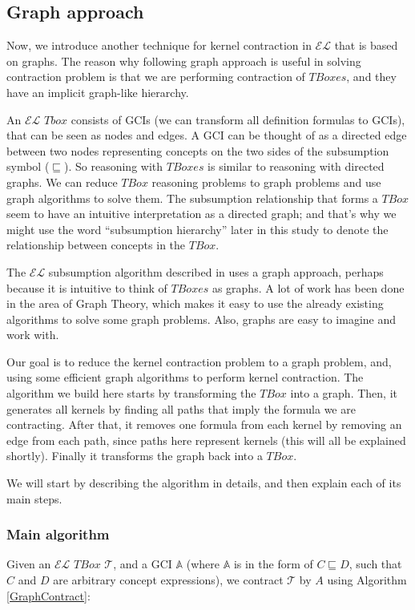 \subsection{Graph approach}
Now, we introduce another technique for kernel contraction in $\mathcal{EL}$ that is based on graphs. The reason why following graph approach is useful in solving contraction problem is that we are performing contraction of $TBoxes$, and they have an implicit graph-like hierarchy. 

An $\mathcal{EL}$ $Tbox$ consists of GCIs (we can transform all definition formulas to GCIs), that can be seen as nodes and edges. A GCI can be thought of as a directed edge between two nodes representing concepts on the two sides of the subsumption symbol ($\sqsubseteq$). So reasoning with $TBoxes$ is similar to reasoning with directed graphs. We can reduce $TBox$ reasoning problems to graph problems and use graph algorithms to solve them. The subsumption relationship that forms a $TBox$ seem to have an intuitive interpretation as a directed graph; and that's why we might use the word ``subsumption hierarchy'' later in this study to denote the relationship between concepts in the $TBox$.

The $\mathcal{EL}$ subsumption algorithm described in \cite{small} uses a graph approach, perhaps because it is intuitive to think of $TBoxes$ as graphs. A lot of work has been done in the area of Graph Theory, which makes it easy to use the already existing algorithms to solve some graph problems. Also, graphs are easy to imagine and work with. 

Our goal is to reduce the kernel contraction problem to a graph problem, and, using some efficient graph algorithms to perform kernel contraction. The algorithm we build here starts by transforming the $TBox$ into a graph. Then, it generates all kernels by finding all paths that imply the formula we are contracting. After that, it removes one formula from each kernel by removing an edge from each path, since paths here represent kernels (this will all be explained shortly). Finally it transforms the graph back into a $TBox$. 

We will start by describing the algorithm in details, and then explain each of its main steps. 

\subsubsection{Main algorithm}
Given an $\mathcal{EL}$ $TBox$ $\mathcal{T}$, and a GCI $\mathbb{A}$ (where $\mathbb{A}$ is in the form of $C \sqsubseteq D$, such that $C$ and $D$ are arbitrary concept expressions), we contract $\mathcal{T}$ by $A$ using Algorithm \ref{GraphContract}:


